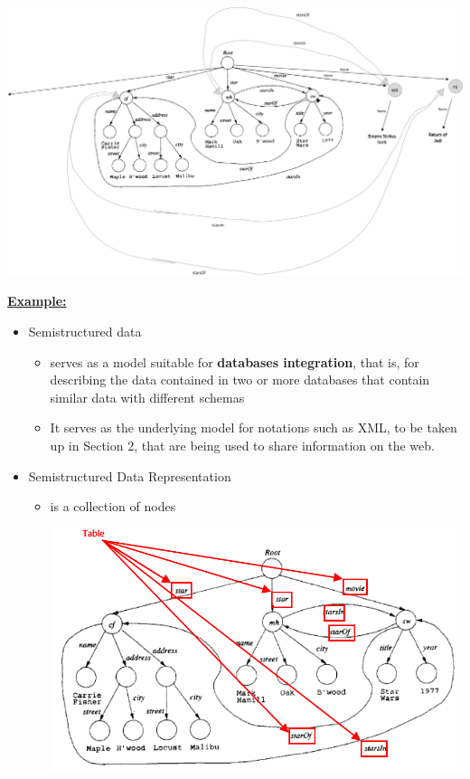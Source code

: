 \documentclass[12pt]{article}
\begin{document}
\begin{enumerate}[1.]
\begin{enumerate}[a)]
    \begin{center}
    \includegraphics[width=\linewidth]{images/worksheet_9_solution_6.png}
    \end{center}


    \end{enumerate}

    \underline{\textbf{Example:}}

    \begin{itemize}
        \item Semistructured data
        \begin{itemize}
            \item serves as a model suitable for \textbf{databases integration}, that is,
            for describing the data contained in two or more databases that contain similar data with
            different schemas

            \item It serves as the underlying model for notations such as XML, to be taken
            up in Section 2, that are being used to share information on the web.
        \end{itemize}

        \item Semistructured Data Representation
        \begin{itemize}
            \item is a collection of nodes

        \begin{center}
        \includegraphics[width=\linewidth]{images/worksheet_9_solution_1.png}
        \end{center}


\end{itemize}
\end{itemize}
\end{enumerate}
\end{document}
